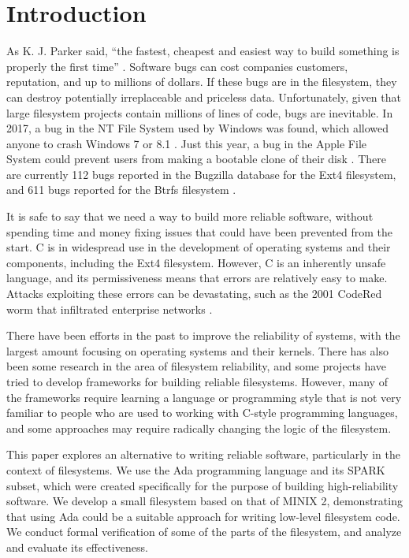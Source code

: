 \section{Introduction}
As K. J. Parker said, ``the fastest, cheapest and easiest way to build something is properly the first time'' \cite{parker2007}.
Software bugs can cost companies customers, reputation, and up to millions of dollars.
If these bugs are in the filesystem, they can destroy potentially irreplaceable and priceless data.
Unfortunately, given that large filesystem projects contain millions of lines of code, bugs are inevitable.
In 2017, a bug in the NT File System used by Windows was found, which allowed anyone to crash Windows 7 or 8.1 \cite{bright2017}.
Just this year, a bug in the Apple File System could prevent users from making a bootable clone of their disk \cite{bombich2020}.
There are currently 112 bugs reported in the Bugzilla database for the Ext4 filesystem, and 611 bugs reported for the Btrfs filesystem \cite{bugzilla2020}.

It is safe to say that we need a way to build more reliable software, without spending time and money fixing issues that could have been prevented from the start.
C is in widespread use in the development of operating systems and their components, including the Ext4 filesystem.
However, C is an inherently unsafe language, and its permissiveness means that errors are relatively easy to make.
Attacks exploiting these errors can be devastating, such as the 2001 CodeRed worm that infiltrated enterprise networks \cite{trendmicro2002}.

There have been efforts in the past to improve the reliability of systems, with the largest amount focusing on operating systems and their kernels.
There has also been some research in the area of filesystem reliability, and some projects have tried to develop frameworks for building reliable filesystems.
However, many of the frameworks require learning a language or programming style that is not very familiar to people who are used to working with C-style programming languages, and some approaches may require radically changing the logic of the filesystem.

This paper explores an alternative to writing reliable software, particularly in the context of filesystems.
We use the Ada programming language and its SPARK subset, which were created specifically for the purpose of building high-reliability software.
We develop a small filesystem based on that of MINIX 2, demonstrating that using Ada could be a suitable approach for writing low-level filesystem code.
We conduct formal verification of some of the parts of the filesystem, and analyze and evaluate its effectiveness.

